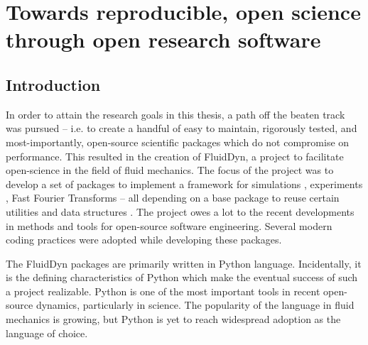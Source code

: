 \chapter{Towards reproducible, open science through open research software}
\section{Introduction}



%


In order to attain the research goals in this thesis, a path off the beaten
track was pursued -- i.e. to create a handful of easy to maintain, rigorously
tested, and most-importantly, open-source scientific packages which do not
compromise on performance.
%
This resulted in the creation of FluidDyn, a project to facilitate open-science
in the field of fluid mechanics.
%
The focus of the project was to develop a set of packages to implement a
framework for simulations \citep{fluidsim}, experiments
\citep{augier_fluidimage_2016,augier_fluidlab_nodate}, Fast Fourier Transforms
\citep{fluidfft} -- all depending on a base package to reuse certain utilities
and data structures \citep{fluiddyn}.
%
The project owes a lot to the recent developments in methods and tools for
open-source software engineering.
%
Several modern coding practices were adopted while developing these packages.


The FluidDyn packages are primarily written in Python language. Incidentally,
it is the defining characteristics of Python which make the eventual success of
such a project realizable.
%
Python is one of the most important tools in recent open-source dynamics,
particularly in science.
%
The popularity of the language in fluid mechanics is growing, but Python is yet
to reach widespread adoption as the language of choice. 

